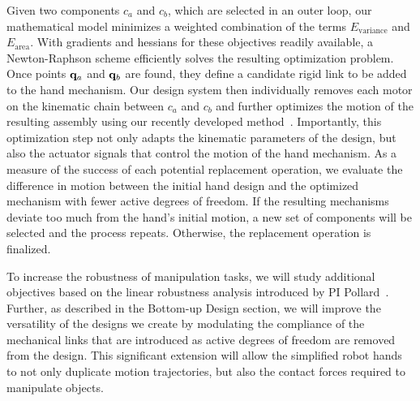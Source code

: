 Given two components $c_a$ and $c_b$, which are selected in an outer loop, our mathematical model minimizes a weighted combination of the terms $E_\mathrm{variance}$ and $E_\mathrm{area}$. With gradients and hessians for these objectives readily available, a Newton-Raphson scheme efficiently solves the resulting optimization problem. Once points $\mathbf{q}_a$ and $\mathbf{q}_b$ are found, they define a candidate rigid link to be added to the hand mechanism. Our design system then individually removes each motor on the kinematic chain between $c_a$ and $c_b$ and further optimizes the motion of the resulting assembly using our recently developed method~\cite{Bacher2015}. Importantly, this optimization step not only adapts the kinematic parameters of the design, but also the actuator signals that control the motion of the hand mechanism. As a measure of the success of each potential replacement operation, we evaluate the difference in motion between the initial hand design and the optimized mechanism with fewer active degrees of freedom. If the resulting mechanisms deviate too much from the hand's initial motion, a new set of components will be selected and the process repeats. Otherwise, the replacement operation is finalized.

To increase the robustness of manipulation tasks, we will study additional objectives based on the linear robustness analysis introduced by PI Pollard~\cite{Pollard:WAFR02,pollard2004closure,pollard20045}. Further, as described in the Bottom-up Design section, we will improve the versatility of the designs we create by modulating the compliance of the mechanical links that are introduced as active degrees of freedom are removed from the design. This significant extension will allow the simplified robot hands to not only duplicate motion trajectories, but also the contact forces required to manipulate objects.


